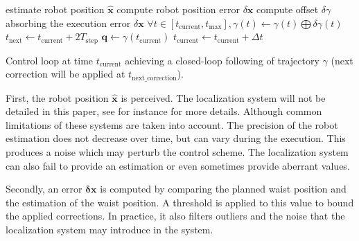 \begin{algorithm}
  \begin{algorithmic}
    \STATE estimate robot position $\mathbf{\hat{x}}$
    \STATE compute robot position error $\delta \mathbf{x}$
    \STATE compute offset $\delta \gamma$ absorbing the execution
    error $\delta \mathbf{x}$
    \STATE $\forall t \in [t_{\text{current}}, t_{\text{max}}],
    \gamma(t) \leftarrow \gamma(t) \bigoplus \delta \gamma(t)$
    \STATE $t_{\text{next}} \leftarrow t_{\text{current}} + 2 T_{\text{step}}$
    \ENDIF
    \ENDIF
    \STATE $\mathbf{q} \leftarrow \gamma(t_{\text{current}})$
    \STATE $t_{\text{current}} \leftarrow t_{\text{current}} + \Delta t$
  \end{algorithmic}
  \caption{Control loop at time $t_{\text{current}}$ achieving a
    closed-loop following of trajectory $\gamma$ (next correction will
    be applied at
    $t_{\text{next\_correction}}$). \label{fig:control_loop}}
\end{algorithm}


First, the robot position $\hat{\mathbf{x}}$ is perceived. The localization
system will not be detailed in this paper, see \cite{06humanoids.thompson,
  05humanoids.thompson} for instance for more details. Although common
limitations of these systems are taken into account. The precision of
the robot estimation does not decrease over time, but can vary during
the execution. This produces a noise which may perturb the
control scheme. The localization system can also fail to provide an
estimation or even sometimes provide aberrant values.

Secondly, an error $\mathbf{\delta \mathbf{x}}$ is computed by comparing the
planned waist position and the estimation of the waist position. A
threshold is applied to this value to bound the applied
corrections. In practice, it also filters outliers and the noise
that the localization system may introduce in the system.


